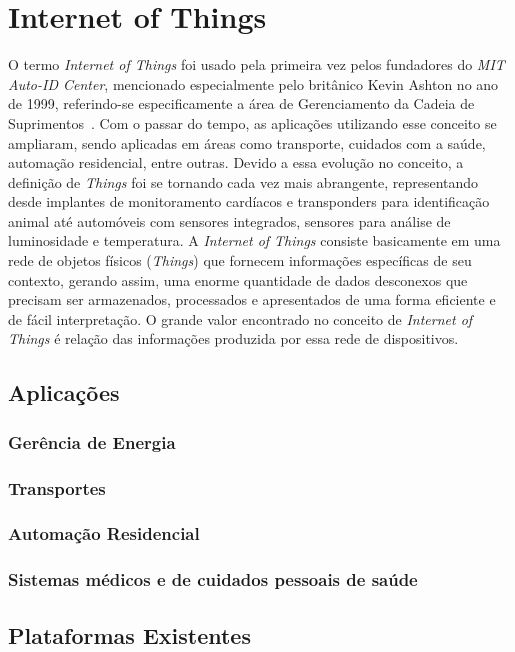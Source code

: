 \section{Internet of Things}
\label{sec:IoT}
O termo \textit{Internet of Things} foi usado pela primeira vez pelos fundadores do \textit{MIT Auto-ID Center},
mencionado especialmente pelo britânico Kevin Ashton no ano de 1999, referindo-se especificamente a área de
Gerenciamento da Cadeia de Suprimentos~\cite{kevinashton2009}. Com o passar do tempo, as aplicações utilizando
esse conceito se ampliaram, sendo aplicadas em áreas como transporte, cuidados com a saúde, automação residencial,
entre outras. Devido a essa evolução no conceito, a definição de \textit{Things} foi se tornando cada vez mais
abrangente, representando desde implantes de monitoramento cardíacos e transponders para identificação animal
até automóveis com sensores integrados, sensores para análise de luminosidade e temperatura.
A \textit{Internet of Things} consiste basicamente em uma rede de objetos físicos (\textit{Things}) que fornecem
informações específicas de seu contexto, gerando assim, uma enorme quantidade de dados desconexos que precisam
ser armazenados, processados e apresentados de uma forma eficiente e de fácil interpretação. O grande valor
encontrado no conceito de \textit{Internet of Things} é relação das informações produzida por essa rede de
dispositivos.

\subsection{Aplicações}
\label{sec:IoTAp}
\subsubsection{Gerência de Energia}
\subsubsection{Transportes}
\subsubsection{Automação Residencial}
\subsubsection{Sistemas médicos e de cuidados pessoais de saúde}

\subsection{Plataformas Existentes}
\label{sec:IoTPlataformas}


